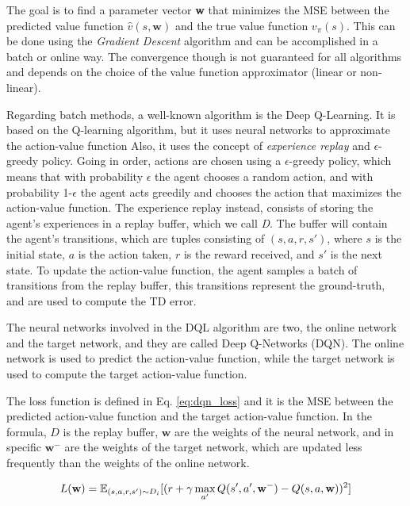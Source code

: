 The goal is to find a parameter vector \textbf{w} that minimizes the MSE between the predicted value function $\hat{v}(s,\textbf{w})$ and the true value function $v_\pi(s)$.
This can be done using the \textit{Gradient Descent} algorithm and can be accomplished in a batch or online way.
The convergence though is not guaranteed for all algorithms and depends on the choice of the value function approximator (linear or non-linear).

Regarding batch methods, a well-known algorithm is the Deep Q-Learning.
It is based on the Q-learning algorithm, but it uses neural networks to approximate the action-value function
Also, it uses the concept of \textit{experience replay} and $\epsilon$-greedy policy.
Going in order, actions are chosen using a $\epsilon$-greedy policy, which means that with probability $\epsilon$ the agent chooses a random action, and with probability 1-$\epsilon$ the agent acts greedily and chooses the action that maximizes the action-value function.
The experience replay instead, consists of storing the agent's experiences in a replay buffer, which we call \textit{D}.
The buffer will contain the agent's transitions, which are tuples consisting of $(s, a, r, s')$, where $s$ is the initial state, $a$ is the action taken, $r$ is the reward received, and $s'$ is the next state.
To update the action-value function, the agent samples a batch of transitions from the replay buffer, this transitions represent the ground-truth, and are used to compute the TD error.

The neural networks involved in the DQL algorithm are two, the online network and the target network, and they are called Deep Q-Networks (DQN).
The online network is used to predict the action-value function, while the target network is used to compute the target action-value function.

The loss function is defined in Eq. \ref{eq:dqn_loss} and it is the MSE between the predicted action-value function and the target action-value function.
In the formula, $D$ is the replay buffer, $\textbf{w}$ are the weights of the neural network, and in specific $\textbf{w}^-$ are the weights of the target network, which are updated less frequently than the weights of the online network.


\begin{equation} \label{eq:dqn_loss}
    L(\textbf{w}) = \operatorname{\mathbb{E}}_{(s, a, r, s') \sim D_i} [(r + \gamma \max_{a'} Q(s', a', \textbf{w}^-) - Q(s, a, \textbf{w}))^2]
\end{equation}

